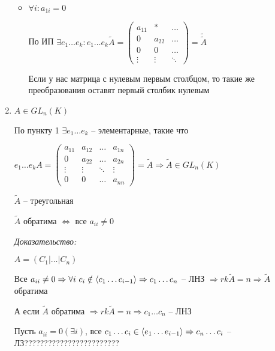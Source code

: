 \documentclass[12pt]{article}
\begin{document}
\begin{enumerate}
\begin{itemize}
        \item $\forall i : a_{1i} = 0$
        
        По ИП $\exists e_1 \ldots e_k : e_1 \ldots e_k \tilde{A} = \begin{pmatrix}
            a_{11} & * & \ldots \\
            0 & a_{22} & \ldots \\
            0 & 0 & \ldots \\
            \vdots & \vdots & \ddots
        \end{pmatrix} = \tilde{\tilde{A}}$

        Если у нас матрица с нулевым первым столбцом, то такие же преобразования оставят первый столбик нулевым
    \end{itemize}

    \item $A \in GL_n(K)$
    
    По пункту 1 $\exists e_1 \ldots e_k$ -- элементарные, такие что

    $e_1 \ldots e_kA = \begin{pmatrix}
        a_{11} & a_{12} & \ldots & a_{1n} \\
        0 & a_{22} & \ldots & a_{2n} \\
        \vdots & \vdots & \ddots & \vdots \\
        0 & 0 & \ldots & a_{nn}
    \end{pmatrix} = \tilde{A} \Rightarrow \tilde{A} \in GL_n(K)$

    \begin{lem}{}
        $\tilde{A}$ -- треугольная

        $\tilde{A}$ обратима $\Leftrightarrow$ все $a_{ii} \neq 0$
    \end{lem}

    \textit{Доказательство:}

    $A = (C_1 | \ldots | C_n)$

    Все $a_{ii} \neq 0 \Rightarrow \forall i\ c_i \notin \q{c_1 \ldots c_{i - 1}} \Rightarrow c_1 \ldots c_n$ -- ЛНЗ $\Rightarrow rk\tilde{A} = n \Rightarrow \tilde{A}$ обратима

    А если $\tilde{A}$ обратима $\Rightarrow rk\tilde{A} = n \Rightarrow c_1 \ldots c_n$ -- ЛНЗ

    Пусть $a_{ii} = 0 (\exists i)$, все $c_1 \ldots c_i \in \langle e_1 \ldots e_{i - 1} \rangle \Rightarrow c_n \ldots c_i$ -- ЛЗ???????????????????????? 

    \vspace{5mm}


\end{enumerate}
\end{document}
